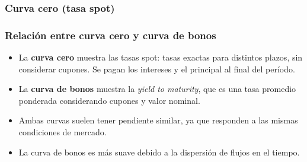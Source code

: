\documentclass{beamer}
\newif\ifpresentacion
\newcommand{\pausa}{\ifpresentacion\pause\fi}
\begin{document}
\begin{frame}
  \frametitle{Curva cero (tasa spot)}
    \begin{center}
      \end{center}
\end{frame}

\begin{frame}
  \frametitle{Relación entre curva cero y curva de bonos}
  \begin{itemize}
    \item La \textbf{curva cero} muestra las tasas spot: tasas exactas para distintos plazos, sin considerar 
    cupones. Se pagan los intereses y el principal al final del período.
    \pausa
    \item La \textbf{curva de bonos} muestra la \textit{yield to maturity}, que es una tasa promedio ponderada considerando cupones y valor nominal.
    \pausa
    \item Ambas curvas suelen tener pendiente similar, ya que responden a las mismas condiciones de mercado.
    \pausa
    \item La curva de bonos es más suave debido a la dispersión de flujos en el tiempo.
  \end{itemize}
  \vspace{1em}
\end{frame}
\end{document}

